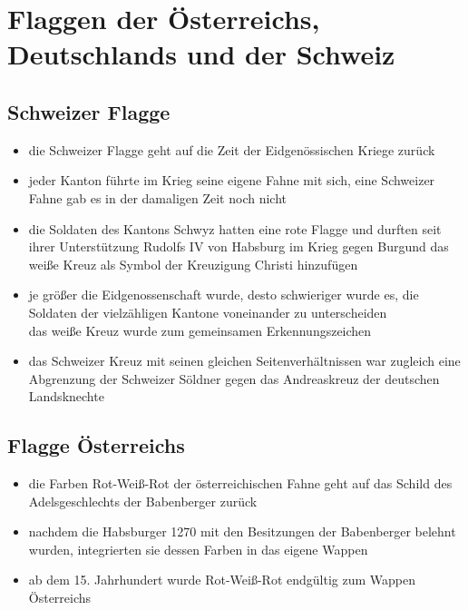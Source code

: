 \documentclass[11pt,a4paper]{article}
\begin{document}
\section*{\textsf{Flaggen der Österreichs, Deutschlands und der Schweiz}}


\subsection*{\textsf{Schweizer Flagge}}

\begin{itemize}

\item die Schweizer Flagge geht auf die Zeit der Eidgenössischen Kriege zurück

\item jeder Kanton führte im Krieg seine eigene Fahne mit sich, eine Schweizer Fahne gab es in der damaligen Zeit noch nicht

\item die Soldaten des Kantons Schwyz hatten eine rote Flagge und durften seit ihrer Unterstützung Rudolfs IV von Habsburg im Krieg gegen Burgund das weiße Kreuz als Symbol der Kreuzigung Christi hinzufügen

\item je größer die Eidgenossenschaft wurde, desto schwieriger wurde es, die Soldaten der vielzähligen Kantone voneinander zu unterscheiden\\
 das weiße Kreuz wurde zum gemeinsamen Erkennungszeichen

\item das Schweizer Kreuz mit seinen gleichen Seitenverhältnissen war zugleich eine Abgrenzung der Schweizer Söldner gegen das Andreaskreuz der deutschen Landsknechte


\end{itemize}



\subsection*{\textsf{Flagge Österreichs}}

\begin{itemize}

\item die Farben Rot-Weiß-Rot der österreichischen Fahne geht auf das Schild des Adelsgeschlechts der Babenberger zurück

\item nachdem die Habsburger 1270 mit den Besitzungen der Babenberger belehnt wurden, integrierten sie dessen Farben in das eigene Wappen

\item ab dem 15. Jahrhundert wurde Rot-Weiß-Rot endgültig zum Wappen Österreichs


\end{itemize}
\end{document}
